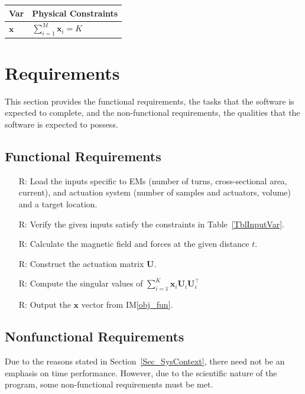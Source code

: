 \documentclass[12pt]{article}
\newcounter{reqnum} %
\begin{document}
\begin{table}[!h]
\caption{Output Variables} \label{TblOutputVar}
\renewcommand{\arraystretch}{1.2}
\noindent \begin{longtable*}{l l} 
  \toprule
  \textbf{Var} & \textbf{Physical Constraints} \\
  \midrule 
  $\bm x$ & $\sum_{i=1}^{M} \bm x_i = K$
  \\
  \bottomrule
\end{longtable*}
\end{table}


\section{Requirements}
This section provides the functional requirements, the tasks that the
software is expected to complete, and the non-functional requirements, the
qualities that the software is expected to possess.

\subsection{Functional Requirements}

\noindent \begin{itemize}

\item[R\refstepcounter{reqnum}\thereqnum \label{R_Inputs}:] Load the inputs specific to EMs (number of turns, cross-sectional area, current), and actuation system (number of samples and actuators, volume) and a target location. 
\item[R\refstepcounter{reqnum}\thereqnum \label{R_InputsSat}:] Verify the given inputs satisfy the constraints in Table~\ref{TblInputVar}.
\item[R\refstepcounter{reqnum}\thereqnum \label{R_CalculateMag}:] Calculate the magnetic field and forces at the given distance  $t$.
\item[R\refstepcounter{reqnum}\thereqnum \label{R_CalculateAct}:] Construct the actuation matrix $\mathcal{\bm U}$. 
\item[R\refstepcounter{reqnum}\thereqnum \label{R_CalculateSing}:] Compute the singular values of $\sum_{i=1}^{K}\bm x_i \mathcal{\bm U}_i \mathcal{\bm U}_i^\top$
\item[R\refstepcounter{reqnum}\thereqnum \label{R_CalculateX}:] Output the $\bm x$ vector from IM\ref{obj_fun}.
\end{itemize}

\subsection{Nonfunctional Requirements}
Due to the reasons stated in Section~\ref{Sec_SysContext}, there need not be an emphasis on time performance. However, due to the scientific nature of the program, some non-functional requirements must be met.  
\end{document}
